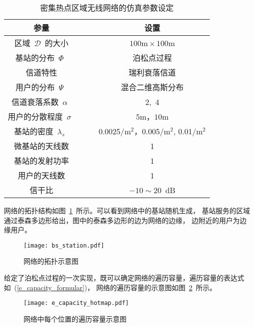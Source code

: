 \begin{table}[htbp]
\caption{密集热点区域无线网络的仿真参数设定}
\label{pc_sim_para}
\vspace{0.5em}\centering\wuhao
\begin{tabular}{cccc}
\toprule[1.5pt]
参量 & & & 设置 \\
\midrule[0.5pt]
区域~$\mathcal{D}$~的大小  & & & ~$100\mathrm{m} \times 100 \mathrm{m}$~ \\
基站的分布~$\Phi$~ & & & 泊松点过程 \\
信道特性 & & & 瑞利衰落信道\\
用户的分布~$\Psi$~  & & & 混合二维高斯分布\\
信道衰落系数~$\alpha$~  & & &  2,~4\\
用户的分散程度~$\sigma$~ & & &  ~$5\mathrm{m}$，$10\mathrm{m}$~ \\
基站的密度~$\lambda_s$~ & & &  0.0025/${\mathrm{m}^2}$，0.005/${\mathrm{m}^2}$, 0.01/${\mathrm{m}^2}$\\
微基站的天线数 & & & 1 \\
基站的发射功率 & & & 1 \\
用户的天线数 & & & 1 \\
信干比 & & & $-10 \sim 20$~dB \\
\bottomrule[1.5pt]
\end{tabular}
\end{table}

网络的拓扑结构如图~\ref{network_dis_show}~所示。可以看到网络中的基站随机生成，
基站服务的区域通过泰森多边形给出，图中的泰森多边形的边为网络的边缘，
边附近的用户为边缘用户。

\begin{figure}[htbp]
\centering
\texttt{[image: bs\_station.pdf]}
\caption{网络的拓扑示意图}\vspace{-0.5em}
\label{network_dis_show}
\end{figure}

给定了泊松点过程的一次实现，既可以确定网络的遍历容量，遍历容量的表达式如~(\ref{e_capacity_formular})，
网络的遍历容量的示意图如图~\ref{e_capacity_show}~所示。
\begin{figure}[htbp]\label{e_capacity_show}
\centering
\texttt{[image: e\_capacity\_hotmap.pdf]}
\caption{网络中每个位置的遍历容量示意图}\vspace{-0.5em}
\label{e_capacity_show}
\end{figure}


